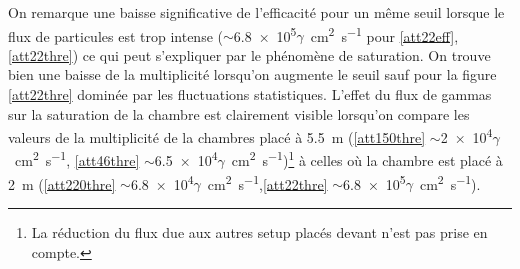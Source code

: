 
On remarque une baisse significative de l'efficacité pour un même seuil lorsque le flux de particules est trop intense ($\sim$\num{6.8e5}$\gamma$\si{\per\square\centi\meter\per\second} pour \ref{att22eff},\ref{att22thre}) ce qui peut s'expliquer par le phénomène de saturation. On trouve bien une baisse de la multiplicité lorsqu'on augmente le seuil sauf pour la figure \ref{att22thre} dominée par les fluctuations statistiques. L'effet du flux de gammas sur la saturation de la chambre est clairement visible lorsqu'on compare les valeurs de la multiplicité de la chambres placé à \SI{5.5}{\meter} (\ref{att150thre} $\sim$\num{2e4}$\gamma$\si{\per\square\centi\meter\per\second}, \ref{att46thre} $\sim$\num{6.5e4}$\gamma$\si{\per\square\centi\meter\per\second})\footnote{La réduction du flux due aux autres setup placés devant n'est pas prise en compte.} à celles où la chambre est placé à \SI{2}{\meter} (\ref{att220thre} $\sim$\num{6.8e4}$\gamma$\si{\per\square\centi\meter\per\second},\ref{att22thre} $\sim$\num{6.8e5}$\gamma$\si{\per\square\centi\meter\per\second}).

